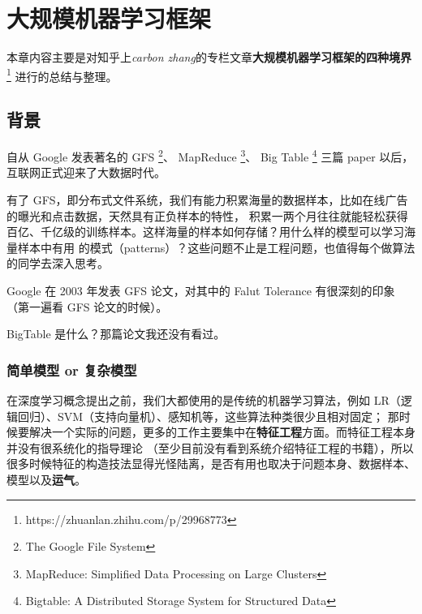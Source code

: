 \chapter{大规模机器学习框架}\label{chap:large-scale-distributed-deep-learning}

\begin{intro}
本章内容主要是对知乎上\textit{carbon zhang}的专栏文章\textbf{大规模机器学习框架的四种境界}%
\footnote{https://zhuanlan.zhihu.com/p/29968773}%
进行的总结与整理。
\end{intro}

\section{背景}\label{sec:background}

自从 Google 发表著名的 GFS%
\footnote{The Google File System}、%
MapReduce%
\footnote{MapReduce: Simplified Data Processing on Large Clusters}、%
Big Table%
\footnote{Bigtable: A Distributed Storage System for Structured Data}%
三篇 paper 以后，互联网正式迎来了大数据时代。

有了 GFS，即分布式文件系统，我们有能力积累海量的数据样本，比如在线广告的曝光和点击数据，天然具有正负样本的特性，
积累一两个月往往就能轻松获得百亿、千亿级的训练样本。这样海量的样本如何存储？用什么样的模型可以学习海量样本中有用
的模式（patterns）？这些问题不止是工程问题，也值得每个做算法的同学去深入思考。

\begin{newnote}[GFS]
Google 在 2003 年发表 GFS 论文，对其中的 Falut Tolerance 有很深刻的印象（第一遍看 GFS 论文的时候）。
\end{newnote}

\begin{newnote}[BigTable]
BigTable 是什么？那篇论文我还没有看过。
\end{newnote}

\subsection{简单模型 or 复杂模型}\label{subsec:simple-or-complex}

在深度学习概念提出之前，我们大都使用的是传统的机器学习算法，例如 LR（逻辑回归）、SVM（支持向量机）、感知机等，这些算法种类很少且相对固定；
那时候要解决一个实际的问题，更多的工作主要集中在\textbf{特征工程}方面。而特征工程本身并没有很系统化的指导理论
（至少目前没有看到系统介绍特征工程的书籍），所以很多时候特征的构造技法显得光怪陆离，是否有用也取决于问题本身、数据样本、模型以及\textbf{运气}。

